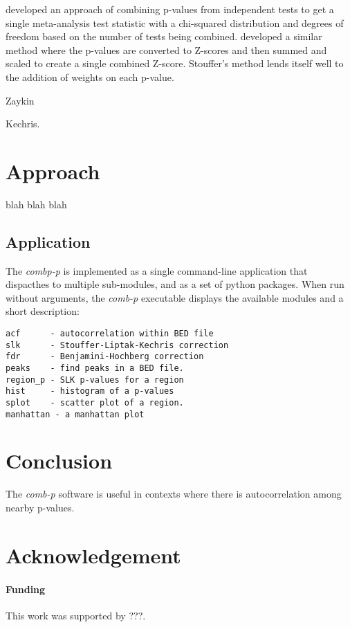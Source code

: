 \documentclass{bioinfo}
\begin{document}
\citep{Fisher} developed an approach of combining p-values from independent tests
to get a single meta-analysis test statistic with a chi-squared distribution 
and degrees of freedom based on the number of tests being combined.
\citep{Stouffer} developed a similar method where the p-values are converted
to Z-scores and then summed and scaled to create a single combined Z-score.
Stouffer's method lends itself well to the addition of weights on each p-value.

Zaykin

Kechris.

\section{Approach}
blah blah blah

\begin{methods}
\section{Application}
The \textit{combp-p} is implemented as a single command-line application that dispacthes to multiple sub-modules, and as a set of python packages. When run without arguments, the \textit{comb-p} executable displays the available modules and a short description:
\begin{verbatim}
acf      - autocorrelation within BED file
slk      - Stouffer-Liptak-Kechris correction
fdr      - Benjamini-Hochberg correction
peaks    - find peaks in a BED file.
region_p - SLK p-values for a region
hist     - histogram of a p-values
splot    - scatter plot of a region.
manhattan - a manhattan plot
\end{verbatim}
\end{methods}

\section{Conclusion}
The \textit{comb-p} software is useful in contexts where there is autocorrelation among nearby p-values.

\section*{Acknowledgement}

\paragraph{Funding\textcolon} This work was supported by ???.
\end{document}

